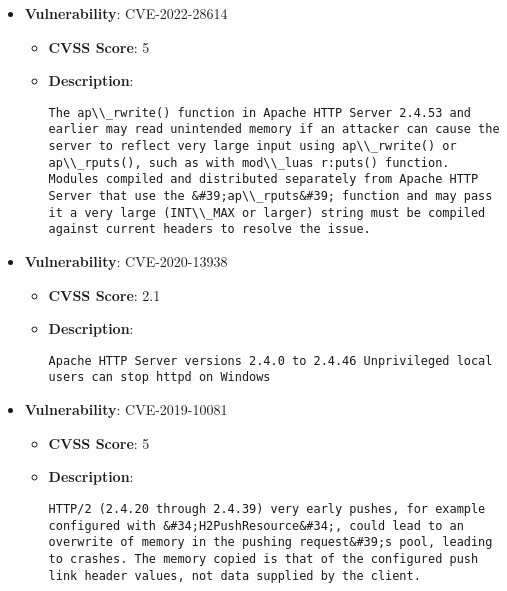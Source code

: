 \documentclass{article}
\begin{document}
\begin{itemize}
    
        \item \textbf{Vulnerability}: CVE-2022-28614
        \begin{itemize}
            \item \textbf{CVSS Score}:  5 
            \item \textbf{Description}:
            \parbox[t]{0.9\linewidth}{
                \verb|The ap\\_rwrite() function in Apache HTTP Server 2.4.53 and earlier may read unintended memory if an attacker can cause the server to reflect very large input using ap\\_rwrite() or ap\\_rputs(), such as with mod\\_luas r:puts() function. Modules compiled and distributed separately from Apache HTTP Server that use the &#39;ap\\_rputs&#39; function and may pass it a very large (INT\\_MAX or larger) string must be compiled against current headers to resolve the issue.|
            }
        \end{itemize}
    
        \item \textbf{Vulnerability}: CVE-2020-13938
        \begin{itemize}
            \item \textbf{CVSS Score}:  2.1 
            \item \textbf{Description}:
            \parbox[t]{0.9\linewidth}{
                \verb|Apache HTTP Server versions 2.4.0 to 2.4.46 Unprivileged local users can stop httpd on Windows|
            }
        \end{itemize}
    
        \item \textbf{Vulnerability}: CVE-2019-10081
        \begin{itemize}
            \item \textbf{CVSS Score}:  5 
            \item \textbf{Description}:
            \parbox[t]{0.9\linewidth}{
                \verb|HTTP/2 (2.4.20 through 2.4.39) very early pushes, for example configured with &#34;H2PushResource&#34;, could lead to an overwrite of memory in the pushing request&#39;s pool, leading to crashes. The memory copied is that of the configured push link header values, not data supplied by the client.|
            }
        \end{itemize}
    

\end{itemize}
\end{document}
